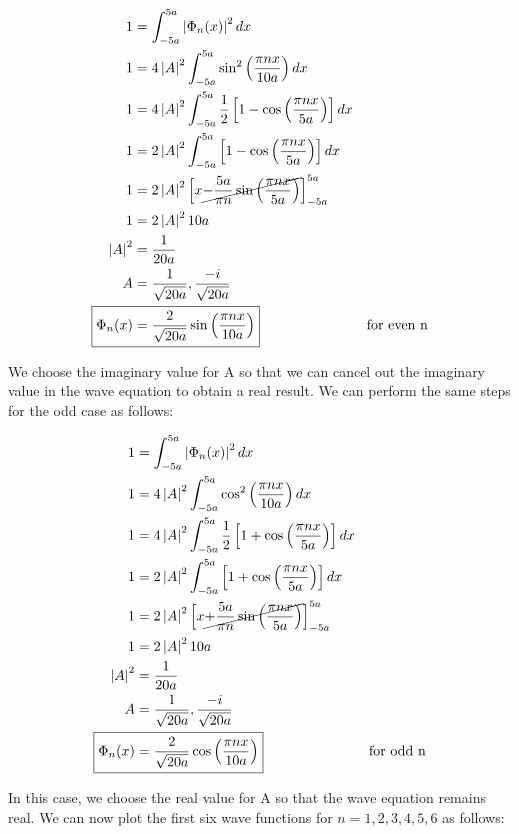 \documentclass[10pt, oneside, letterpaper]{article}
\begin{document}
\begin{align*}
  1 &= \int_{-5a}^{5a}\left|\Phi_n(x)\right|^2dx \\
  1 &= 4\left|A\right|^2\int_{-5a}^{5a}\sin^2\left(\frac{\pi nx}{10a}\right)dx \\
  1 &= 4\left|A\right|^2\int_{-5a}^{5a}\frac{1}{2}\left[1-\cos\left(\frac{\pi nx}{5a}\right)\right]dx \\
  1 &= 2\left|A\right|^2\int_{-5a}^{5a}\left[1-\cos\left(\frac{\pi nx}{5a}\right)\right]dx \\
  1 &= 2\left|A\right|^2\left[x\cancel{-\frac{5a}{\pi n}\sin\left(\frac{\pi nx}{5a}\right)}\right]_{-5a}^{5a} \\
  1 &= 2\left|A\right|^2 10a \\
  \left|A\right|^2 &= \frac{1}{20a} \\
  A &= \frac{1}{\sqrt{20a}}, \frac{-i}{\sqrt{20a}} \\
  \Aboxed{\Phi_n(x) &= \frac{2}{\sqrt{20a}}\sin\left(\frac{\pi nx}{10a}\right)} &\text{for even n}
\end{align*}

We choose the imaginary value for A so that we can cancel out the imaginary value in the wave equation to obtain a real result. We can perform the same steps for the odd case as follows:

\begin{align*}
  1 &= \int_{-5a}^{5a}\left|\Phi_n(x)\right|^2dx \\
  1 &= 4\left|A\right|^2\int_{-5a}^{5a}\cos^2\left(\frac{\pi nx}{10a}\right)dx \\
  1 &= 4\left|A\right|^2\int_{-5a}^{5a}\frac{1}{2}\left[1+\cos\left(\frac{\pi nx}{5a}\right)\right]dx \\
  1 &= 2\left|A\right|^2\int_{-5a}^{5a}\left[1+\cos\left(\frac{\pi nx}{5a}\right)\right]dx \\
  1 &= 2\left|A\right|^2\left[x\cancel{+\frac{5a}{\pi n}\sin\left(\frac{\pi nx}{5a}\right)}\right]_{-5a}^{5a} \\
  1 &= 2\left|A\right|^2 10a \\
  \left|A\right|^2 &= \frac{1}{20a} \\
  A &= \frac{1}{\sqrt{20a}}, \frac{-i}{\sqrt{20a}} \\
  \Aboxed{\Phi_n(x) &= \frac{2}{\sqrt{20a}}\cos\left(\frac{\pi nx}{10a}\right)} &\text{for odd n}
\end{align*}

In this case, we choose the real value for A so that the wave equation remains real. We can now plot the first six wave functions for $n = 1, 2, 3, 4, 5, 6$ as follows:
\end{document}
